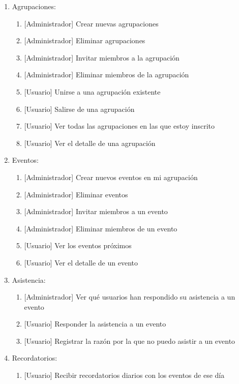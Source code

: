 \begin{enumerate}
    \item Agrupaciones:
    \begin{enumerate}
        \item {[Administrador]} Crear nuevas agrupaciones
        \item {[Administrador]} Eliminar agrupaciones
        \item {[Administrador]} Invitar miembros a la agrupación
        \item {[Administrador]} Eliminar miembros de la agrupación
        \item {[Usuario]} Unirse a una agrupación existente
        \item {[Usuario]} Salirse de una agrupación
        \item {[Usuario]} Ver todas las agrupaciones en las que estoy inscrito
        \item {[Usuario]} Ver el detalle de una agrupación
    \end{enumerate}
    \item Eventos:
    \begin{enumerate}
        \item {[Administrador]} Crear nuevos eventos en mi agrupación
        \item {[Administrador]} Eliminar eventos
        \item {[Administrador]} Invitar miembros a un evento
        \item {[Administrador]} Eliminar miembros de un evento
        \item {[Usuario]} Ver los eventos próximos
        \item {[Usuario]} Ver el detalle de un evento
    \end{enumerate}
    \item Asistencia:
    \begin{enumerate}
        \item {[Administrador]} Ver qué usuarios han respondido su asistencia a un evento
        \item {[Usuario]} Responder la asistencia a un evento
        \item {[Usuario]} Registrar la razón por la que no puedo asistir a un evento
    \end{enumerate}
    \item Recordatorios:
    \begin{enumerate}
        \item {[Usuario]} Recibir recordatorios diarios con los eventos de ese día

\end{enumerate}
\end{enumerate}
